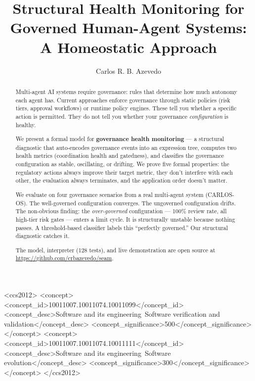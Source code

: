 \documentclass[sigconf,nonacm]{acmart}
\begin{document}
\title{Structural Health Monitoring for Governed Human-Agent Systems:\\A Homeostatic Approach}

\author{Carlos R. B. Azevedo}

\begin{abstract}
Multi-agent AI systems require governance: rules that determine how much
autonomy each agent has. Current approaches enforce governance through
static policies (risk tiers, approval workflows) or runtime policy engines.
These tell you whether a specific action is permitted. They do not tell you
whether your governance \emph{configuration} is healthy.

We present a formal model for \textbf{governance health monitoring} --- a
structural diagnostic that auto-encodes governance events into an
expression tree, computes two health metrics (coordination health and
gatedness), and classifies the governance configuration as stable,
oscillating, or drifting. We prove five formal properties: the regulatory
actions always improve their target metric, they don't interfere with each
other, the evaluation always terminates, and the application order doesn't
matter.

We evaluate on four governance scenarios from a real multi-agent system
(CARLOS-OS). The well-governed configuration converges. The ungoverned
configuration drifts. The non-obvious finding: the \emph{over-governed}
configuration --- 100\% review rate, all high-tier risk gates --- enters a
limit cycle. It is structurally unstable because nothing passes.
A threshold-based classifier labels this ``perfectly governed.'' Our
structural diagnostic catches it.

The model, interpreter (128 tests), and live demonstration are open source
at \url{https://github.com/crbazevedo/seam}.
\end{abstract}

\begin{CCSXML}
<ccs2012>
<concept>
<concept_id>10011007.10011074.10011099</concept_id>
<concept_desc>Software and its engineering~Software verification and validation</concept_desc>
<concept_significance>500</concept_significance>
</concept>
<concept>
<concept_id>10011007.10011074.10011111</concept_id>
<concept_desc>Software and its engineering~Software evolution</concept_desc>
<concept_significance>300</concept_significance>
</concept>
</ccs2012>
\end{CCSXML}
\end{document}

